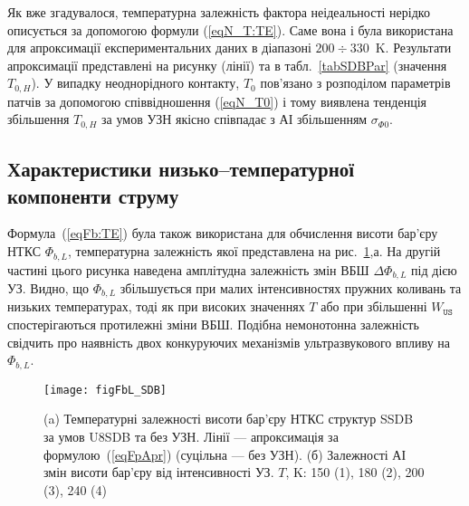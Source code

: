 Як вже згадувалося, температурна залежність фактора неідеальності нерідко описується за допомогою формули (\ref{eqN_T:TE}).
Саме вона і була використана для апроксимації експериментальних даних в діапазоні $200\div330$~K.
Результати апроксимації представлені на рисунку (лінії) та в табл.~\ref{tabSDBPar} (значення $T_{0,H}$).
У випадку неоднорідного контакту, $T_0$ пов'язано з розподілом параметрів патчів
за допомогою співвідношення (\ref{eqN_T0}) і тому виявлена тенденція
збільшення $T_{0,H}$ за умов УЗН якісно співпадає з АІ збільшенням $\sigma_{\Phi0}$.





\subsection{Характеристики низько--температурної компоненти струму}

Формула~(\ref{eqFb:TE}) була також використана для обчислення висоти бар'єру НТКС $\Phi_{b,L}$, температурна залежність
якої представлена на рис.~\ref{figFbL_SDB},а.
На другій частині цього рисунка наведена амплітудна залежність змін ВБШ $\Delta \Phi_{b,L}$ під дією УЗ.
Видно, що $\Phi_{b,L}$ збільшується при малих інтенсивностях пружних коливань та низьких температурах,
тоді як при високих значеннях $T$ або при збільшенні $W_\mathtt{US}$ спостерігаються протилежні зміни ВБШ.
Подібна немонотонна залежність свідчить про наявність двох конкуруючих механізмів ультразвукового впливу на $\Phi_{b,L}$.


\begin{figure}
\center
\texttt{[image: figFbL\_SDB]}
\caption{\label{figFbL_SDB}
(a) Температурні залежності висоти бар'єру НТКС структур SSDB за умов U8SDB та без УЗН.
Лінії --- апроксимація за формулою~(\ref{eqFpApr}) (суцільна --- без УЗН).
(б) Залежності АІ змін висоти бар'єру від інтенсивності УЗ.
$T$, K: 150 (1), 180 (2), 200 (3), 240 (4)
}%
\end{figure}

